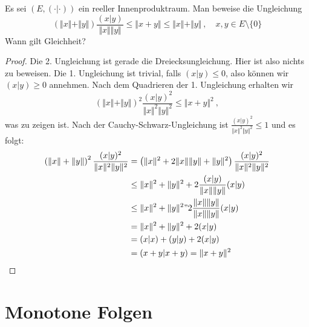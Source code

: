 \setcounter{aufgabe}{5}
\begin{aufgabe}
	Es sei $(E, (\cdot | \cdot))$ ein reeller Innenproduktraum. Man beweise die Ungleichung
	\[
		(\Vert x \Vert + \Vert y \Vert) \frac{(x|y)}{\Vert x \Vert \Vert y \Vert}
			\leq \Vert x + y \Vert
			\leq \Vert x \Vert + \Vert y \Vert \ , \quad x,y \in E\setminus\{0\}
	\]
	Wann gilt Gleichheit?
\end{aufgabe}
\begin{proof}
	Die 2. Ungleichung ist gerade die Dreiecksungleichung. Hier ist also nichts zu beweisen.
	Die 1. Ungleichung ist trivial, falls $(x | y) \leq 0$, also können wir $(x | y) \geq 0$
	annehmen.
	Nach dem Quadrieren der 1. Ungleichung erhalten wir
	\[
		\left( \Vert x \Vert + \Vert y \Vert \right)^2 \frac{ (x|y)^2 }{\Vert x \Vert^2 \Vert y \Vert^2}
			\leq \Vert x + y \Vert^2 \ ,
	\]
	was zu zeigen ist. Nach der Cauchy-Schwarz-Ungleichung ist
	$\frac{ (x | y)^2}{ \Vert x \Vert^2 \Vert y \Vert^2} \leq 1$ und es
	folgt:
	\begin{align*}
		\left( \Vert x \Vert + \Vert y \Vert \right)^2 \frac{ (x|y)^2 }{\Vert x \Vert^2 \Vert y \Vert^2}
		 &= \left( \Vert x \Vert^2 + 2 \Vert x \Vert \Vert y \Vert + \Vert y \Vert^2 \right)
		 \frac{ (x | y)^2 }{ \Vert x \Vert^2 \Vert y \Vert^2} \\
		 &\leq \Vert x \Vert^2 + \Vert y \Vert^2 + 2 \frac{ (x | y) }{ \Vert x \Vert \Vert y \Vert}
		 (x | y) \\
		 &\leq \Vert x \Vert^2 + \Vert y \Vert^2 " 2 \frac{ \Vert x \Vert \Vert y \Vert}{ 
			 	\Vert x \Vert \Vert y \Vert } (x | y) \\
			&= \Vert x \Vert^2 + \Vert y \Vert^2 + 2 (x | y) \\
			&= (x | x) + (y | y) + 2(x | y) \\
			&= (x + y | x + y) = \Vert x + y \Vert^2
	\end{align*}
\end{proof}

\section{Monotone Folgen}

